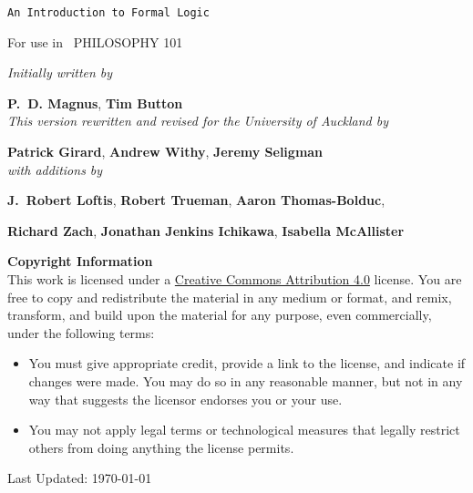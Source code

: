 \documentclass[PHIL101-Textbook.tex]{subfiles}
\begin{document}
\thispagestyle{empty}
{\Huge\forallx}

\medskip
{\tt An Introduction to Formal Logic}


\vfill


For use in \ {\Huge \sf PHILOSOPHY 101} 






\vfill
\noindent\textit{Initially written by} 

\textbf{P.~D. Magnus}, %
\textbf{Tim Button}\\%



\noindent\textit{This version rewritten and revised for the University of Auckland by}

\textbf{Patrick Girard}, 
\textbf{Andrew Withy},
\textbf{Jeremy Seligman}\\

\noindent\textit{with additions by}

\textbf{J.~Robert Loftis}, 
\textbf{Robert Trueman}, 
\textbf{Aaron Thomas-Bolduc}, 

\textbf{Richard Zach}, 
\textbf{Jonathan Jenkins Ichikawa}, 
\textbf{Isabella McAllister}

\newpage


\textbf{Copyright Information}\\

\noindent \footnotesize This work is licensed under a \href{https://creativecommons.org/licenses/by/4.0/}{Creative Commons Attribution 4.0} license. 
You are free to copy and redistribute the material in any medium or format, and  remix, transform, and build upon the material for any purpose, even commercially, under the following terms:
\begin{itemize}
\item You must give appropriate credit, provide a link to the license, and indicate if changes were made. You may do so in any reasonable manner, but not in any way that suggests the licensor endorses you or your use.
\item You may not apply legal terms or technological measures that legally restrict others from doing anything the license permits.
\end{itemize}

\medskip

\noindent Last Updated: \today
\end{document}
